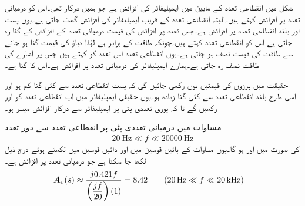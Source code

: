 شکل  میں انقطاعی تعدد کے مابین  میں ایمپلیفائر کی افزائش  ہے جو ہمیں درکار تھی۔اس کو درمیانی تعدد پر افزائش کہتے ہیں۔البتہ انقطاعی تعدد کے قریب ایمپلیفائر کی افزائش گھٹ جاتی ہے۔یوں پست اور بلند انقطاعی تعدد پر افزائش  ہے۔جس تعدد پر افزائش کی قیمت درمیانی تعدد کے افزائش کے  گنا رہ جاتی ہے اس کو انقطاعی تعدد کہتے ہیں۔چونکہ طاقت  کے برابر ہے لہٰذا دباؤ کی قیمت  گنا ہو جانے سے طاقت کی قیمت نصف ہو جاتی ہے۔یوں انقطاعی تعدد اس تعدد کو کہتے ہیں جس پر اشارے کی طاقت نصف رہ جاتی ہے۔ہمارے ایمپلیفائر کی درمیانی تعدد پر افزائش   ہے۔اس کا  گنا   ہے۔

حقیقت میں پرزوں کی قیمتیں یوں رکھی جائیں گی کہ پست انقطاعی تعدد  سے کئی گنا کم ہو اور اسی طرح بلند انقطاعی تعدد  سے کئی گنا زیادہ ہو۔یوں حقیقی ایمپلیفائر میں آپ انقطاعی تعدد کو  اور  رکھیں گے تا کہ پوری تعددی پٹی پر ایمپلیفائر سے درکار افزائش میسر ہو۔ 

مساوات  میں درمیانی تعددی پٹی پر انقطاعی تعدد سے دور  تعدد
\begin{align*}
\SI{20}{\hertz} \ll f \ll \SI{20000}{\hertz}
\end{align*}
کی صورت میں  اور  ہو گا۔یوں مساوات  کے بائیں قوسین میں اور دائیں قوسین میں  لکھتے ہوئے درج ذیل لکھا جا سکتا ہے جو درمیانی تعدد پر افزائش ہے۔
\begin{align*}
{\ensuremath{{\boldsymbol{A}}}}_v(s)&\approx  \dfrac{j 0.421f}{\left(\dfrac{jf }{20}\right)\left(1\right)}=8.42  \quad \quad (\SI{20}{\hertz} \ll f \ll \SI{20}{\kilo\hertz})
\end{align*}


